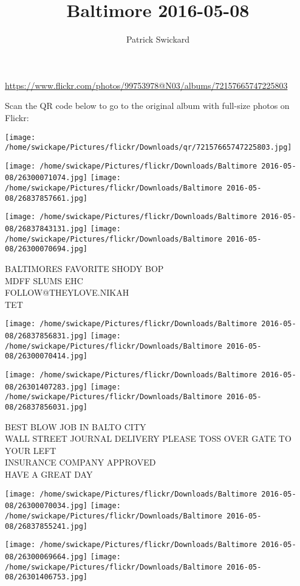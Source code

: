 \documentclass[10pt,letterpaper]{article}
\title{Baltimore 2016-05-08}
\author{Patrick Swickard}
\date{}
\begin{document}
\maketitle

\url{https://www.flickr.com/photos/99753978@N03/albums/72157665747225803}

Scan the QR code below to go to the original album with full-size photos on Flickr:

\texttt{[image: /home/swickape/Pictures/flickr/Downloads/qr/72157665747225803.jpg]}
\pagebreak

\texttt{[image: /home/swickape/Pictures/flickr/Downloads/Baltimore 2016-05-08/26300071074.jpg]}
\texttt{[image: /home/swickape/Pictures/flickr/Downloads/Baltimore 2016-05-08/26837857661.jpg]}

\texttt{[image: /home/swickape/Pictures/flickr/Downloads/Baltimore 2016-05-08/26837843131.jpg]}
\texttt{[image: /home/swickape/Pictures/flickr/Downloads/Baltimore 2016-05-08/26300070694.jpg]}

BALTIMORES FAVORITE SHODY BOP\\
MDFF SLUMS EHC\\
FOLLOW@THEYLOVE.NIKAH\\
TET
\pagebreak

\texttt{[image: /home/swickape/Pictures/flickr/Downloads/Baltimore 2016-05-08/26837856831.jpg]}
\texttt{[image: /home/swickape/Pictures/flickr/Downloads/Baltimore 2016-05-08/26300070414.jpg]}

\texttt{[image: /home/swickape/Pictures/flickr/Downloads/Baltimore 2016-05-08/26301407283.jpg]}
\texttt{[image: /home/swickape/Pictures/flickr/Downloads/Baltimore 2016-05-08/26837856031.jpg]}

BEST BLOW JOB IN BALTO CITY\\
WALL STREET JOURNAL DELIVERY PLEASE TOSS OVER GATE TO YOUR LEFT\\
INSURANCE COMPANY APPROVED\\
HAVE A GREAT DAY
\pagebreak

\texttt{[image: /home/swickape/Pictures/flickr/Downloads/Baltimore 2016-05-08/26300070034.jpg]}
\texttt{[image: /home/swickape/Pictures/flickr/Downloads/Baltimore 2016-05-08/26837855241.jpg]}

\texttt{[image: /home/swickape/Pictures/flickr/Downloads/Baltimore 2016-05-08/26300069664.jpg]}
\texttt{[image: /home/swickape/Pictures/flickr/Downloads/Baltimore 2016-05-08/26301406753.jpg]}
\end{document}
